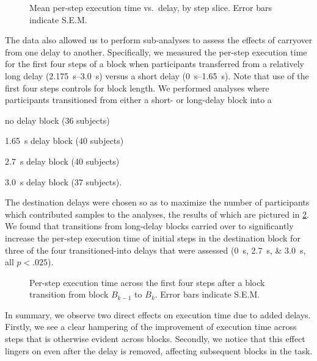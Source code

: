 \documentclass[10pt,letterpaper]{article}
\begin{document}
\begin{figure}[h]
    \centering
    \caption{Mean per-step execution time vs.\ delay, by step slice.
    Error bars indicate S.E.M.}
    \label{fig:exectime:delay:slice}
\end{figure}

The data also allowed us to perform sub-analyses to assess the effects of carryover from one delay to another.
Specifically, we measured the per-step execution time for the first four steps of a block when participants transferred from a relatively long delay (\SIrange{2.175}{3.0}{\second}) versus a short delay (\SIrange{0}{1.65}{\second}).
Note that use of the first four steps controls for block length.
We performed analyses where participants transitioned from either a short- or long-delay block into a
\begin{enumerate*}[label=(\roman*), before=\unskip{: }, itemjoin={{; }}, itemjoin*={{; and }}]
  \item no delay block (36 subjects)
  \item \SI{1.65}{\second} delay block (40 subjects)
  \item \SI{2.7}{\second} delay block (40 subjects)
  \item \SI{3.0}{\second} delay block (37 subjects).
\end{enumerate*}
The destination delays were chosen so as to maximize the number of participants which contributed samples to the analyses, the results of which are pictured in \cref{fig:exectime:transition}.
We found that transitions from long-delay blocks carried over to significantly increase the per-step execution time of initial steps in the destination block for three of the four transitioned-into delays that were assessed (\SIlist{0;2.7;3.0}{\second}, all \( p < .025\)).

\begin{figure}[h]
  \centering
  \caption{Per-step execution time across the first four steps after a block transition from block \( B_{k-1} \) to \( B_k \). Error bars indicate S.E.M.}\label{fig:exectime:transition}%
\end{figure}

In summary, we observe two direct effects on execution time due to added delays.
Firstly, we see a clear hampering of the improvement of execution time across steps that is otherwise evident across blocks.
Secondly, we notice that this effect lingers on even after the delay is removed, affecting subsequent blocks in the task.
\end{document}
